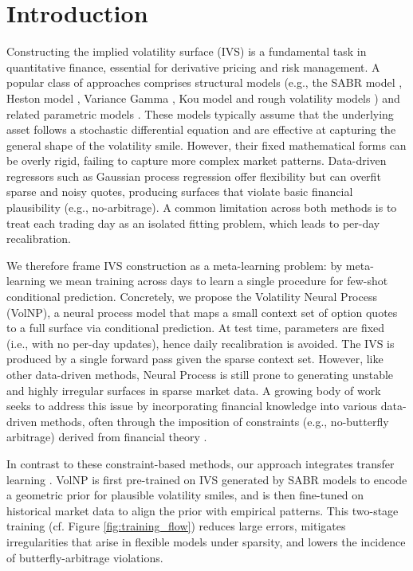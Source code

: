 \documentclass[authoryear,preprint,review,12pt]{elsarticle}
\begin{document}
\section{Introduction}
Constructing the implied volatility surface (IVS) is a fundamental task in quantitative finance, essential for derivative pricing and risk management. A popular class of approaches comprises structural models (e.g., the SABR model \citep{Hagan2002}, Heston model \citep{heston1993closed}, Variance Gamma \citep{madan1998variance}, Kou model \citep{kou2002jump} and rough volatility models \citep{bayer2016pricing,gatheral2022volatility}) and related parametric models \citep{gatheral2004parsimonious, gatheral2014arbitrage}. These models typically assume that the underlying asset follows a stochastic differential equation and are effective at capturing the general shape of the volatility smile. However, their fixed mathematical forms can be overly rigid, failing to capture more complex market patterns. Data-driven regressors such as Gaussian process regression \citep{Spiegeleer2018,roberts2021probabilistic} offer flexibility but can overfit sparse and noisy quotes, producing surfaces that violate basic financial plausibility (e.g., no-arbitrage). A common limitation across both methods is to treat each trading day as an isolated fitting problem, which leads to per-day recalibration.


We therefore frame IVS construction as a meta-learning problem: by meta-learning we mean training across days to learn a single procedure for few-shot conditional prediction. Concretely, we propose the Volatility Neural Process (VolNP), a neural process model \citep{garnelo2018conditional, garnelo2018neural} that maps a small context set of option quotes to a full surface via conditional prediction. At test time, parameters are fixed (i.e., with no per-day updates), hence daily recalibration is avoided. The IVS is produced by a single forward pass given the sparse context set. However, like other data-driven methods, Neural Process is still prone to generating unstable and highly irregular surfaces in sparse market data. A growing body of work seeks to address this issue by incorporating financial knowledge into various data-driven methods, often through the imposition of constraints (e.g., no-butterfly arbitrage) derived from financial theory \citep{Ackerer2020,chataigner2021beyond,zheng2021incorporating,hoshisashi2023no,cont2023simulation,ning2023arbitrage,vuletic2024volgan,gonon2024operator}.

In contrast to these constraint-based methods, our approach integrates transfer learning \citep{chen2023teaching}. VolNP is first pre-trained on IVS generated by SABR models to encode a geometric prior for plausible volatility smiles, and is then fine-tuned on historical market data to align the prior with empirical patterns. This two-stage training (cf. Figure \ref{fig:training_flow}) reduces large errors, mitigates irregularities that arise in flexible models under sparsity, and lowers the incidence of butterfly-arbitrage violations.
\end{document}
